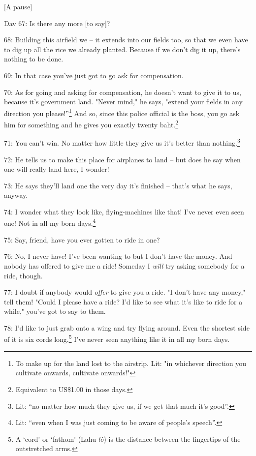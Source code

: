 \begin{center}
[A pause]
\end{center}

\leftskip=0pt
Dav 67: Is there any more [to say]?

68: Building this airfield we -- it extends into our fields too, so that we even
have to dig up all the rice we already planted. Because if we don't dig it up,
there's nothing to be done.

69: In that case you've just got to go ask for compensation.

70: As for going and asking for compensation, he doesn't want to give it to us,
because it's government land. "Never mind," he says, "extend
your fields in any direction you please!''\footnote{To make up for the land lost to the airstrip. Lit: "in whichever direction you cultivate onwards, cultivate onwards!"} And so, since this police official
is the boss, you go ask him for something and he gives you exactly twenty baht.\footnote{Equivalent to US\$1.00 in those days.}

71: You can't win. No matter how little they give us it's better than nothing.\footnote{Lit: ``no matter how much they give us, if we get that much it's good''.}

72: He tells us to make this place for airplanes to land -- but does he say when
one will really land here, I wonder!

73: He says they'll land one the very day it's finished -- that's what he says,
anyway.

74: I wonder what they look like, flying-machines like that! I've never even seen
one! Not in all my born days.\footnote{Lit: ``even when I was just coming to be aware of people's speech''.}

75: Say, friend, have you ever gotten to ride in one?

76: No, I never have! I've been wanting to but I don't have the money. And nobody
has offered to give me a ride! Someday I \textit{will} try asking somebody for
a ride, though.

77: I doubt if anybody would \textit{offer} to give you a ride. "I don't
have any money," tell them! "Could I please have a ride? I'd
like to see what it's like to ride for a while," you've got to say to
them.

78: I'd like to just grab onto a wing and try flying around. Even the shortest
side of it is six cords long.\footnote{A `cord' or `fathom' (Lahu \textit{lò}) is the distance between the fingertips of the outstretched arms.} I've never seen anything like it in all my born
days.

